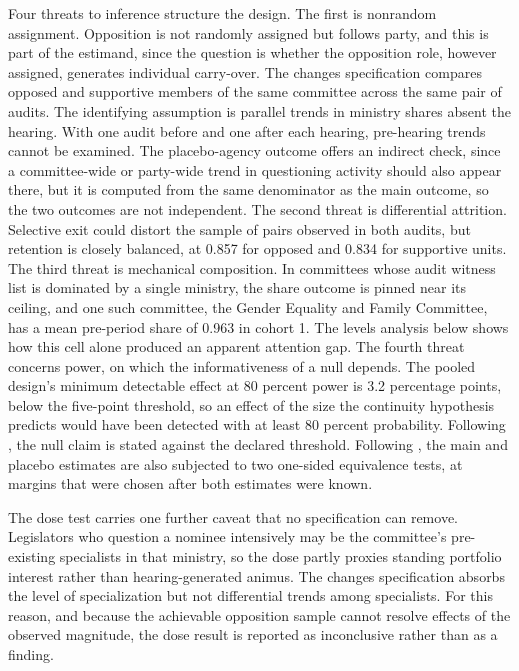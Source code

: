 \documentclass[11pt]{article}
\begin{document}
Four threats to inference structure the design. The first is nonrandom assignment. Opposition is not randomly assigned but follows party, and this is part of the estimand, since the question is whether the opposition role, however assigned, generates individual carry-over. The changes specification compares opposed and supportive members of the same committee across the same pair of audits. The identifying assumption is parallel trends in ministry shares absent the hearing. With one audit before and one after each hearing, pre-hearing trends cannot be examined. The placebo-agency outcome offers an indirect check, since a committee-wide or party-wide trend in questioning activity should also appear there, but it is computed from the same denominator as the main outcome, so the two outcomes are not independent. The second threat is differential attrition. Selective exit could distort the sample of pairs observed in both audits, but retention is closely balanced, at 0.857 for opposed and 0.834 for supportive units. The third threat is mechanical composition. In committees whose audit witness list is dominated by a single ministry, the share outcome is pinned near its ceiling, and one such committee, the Gender Equality and Family Committee, has a mean pre-period share of 0.963 in cohort 1. The levels analysis below shows how this cell alone produced an apparent attention gap. The fourth threat concerns power, on which the informativeness of a null depends. The pooled design's minimum detectable effect at 80 percent power is 3.2 percentage points, below the five-point threshold, so an effect of the size the continuity hypothesis predicts would have been detected with at least 80 percent probability. Following \citet{rainey2014}, the null claim is stated against the declared threshold. Following \citet{hartman2018}, the main and placebo estimates are also subjected to two one-sided equivalence tests, at margins that were chosen after both estimates were known.

The dose test carries one further caveat that no specification can remove. Legislators who question a nominee intensively may be the committee's pre-existing specialists in that ministry, so the dose partly proxies standing portfolio interest rather than hearing-generated animus. The changes specification absorbs the level of specialization but not differential trends among specialists. For this reason, and because the achievable opposition sample cannot resolve effects of the observed magnitude, the dose result is reported as inconclusive rather than as a finding.
\end{document}
